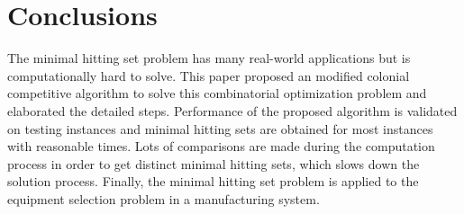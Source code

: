 \section{Conclusions}
The minimal hitting set problem has many real-world applications but is computationally hard to solve.
This paper proposed an modified colonial competitive algorithm to solve this combinatorial optimization problem and elaborated the detailed steps.
Performance of the proposed algorithm is validated on testing instances and minimal hitting sets are obtained for most instances with reasonable times.
Lots of comparisons are made during the computation process in order to get distinct minimal hitting sets, which slows down the solution process.
Finally, the minimal hitting set problem is applied to the equipment selection problem in a manufacturing system.

